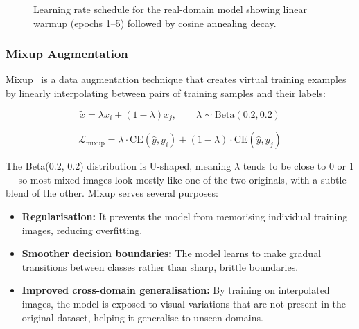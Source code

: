 \documentclass[12pt, a4paper]{article}
\begin{document}
\begin{figure}[H]
\centering
{}
\caption{Learning rate schedule for the real-domain model showing linear warmup
(epochs 1--5) followed by cosine annealing decay.}
\label{fig:lr_schedule}
\end{figure}

\subsubsection{Mixup Augmentation}

Mixup~\cite{zhang2018mixup} is a data augmentation technique that creates
virtual training examples by linearly interpolating between pairs of training
samples and their labels:

\begin{equation}
\tilde{x} = \lambda x_i + (1 - \lambda) x_j, \qquad
\lambda \sim \text{Beta}(0.2, 0.2)
\end{equation}

\begin{equation}
\mathcal{L}_{\text{mixup}} = \lambda \cdot \text{CE}(\hat{y}, y_i) +
(1 - \lambda) \cdot \text{CE}(\hat{y}, y_j)
\end{equation}

The Beta(0.2, 0.2) distribution is U-shaped, meaning $\lambda$ tends to be
close to 0 or 1 --- so most mixed images look mostly like one of the two
originals, with a subtle blend of the other.  Mixup serves several purposes:
\begin{itemize}[leftmargin=*]
    \item \textbf{Regularisation:} It prevents the model from memorising
          individual training images, reducing overfitting.
    \item \textbf{Smoother decision boundaries:} The model learns to make
          gradual transitions between classes rather than sharp, brittle boundaries.
    \item \textbf{Improved cross-domain generalisation:} By training on
          interpolated images, the model is exposed to visual variations that
          are not present in the original dataset, helping it generalise to
          unseen domains.
\end{itemize}
\end{document}

